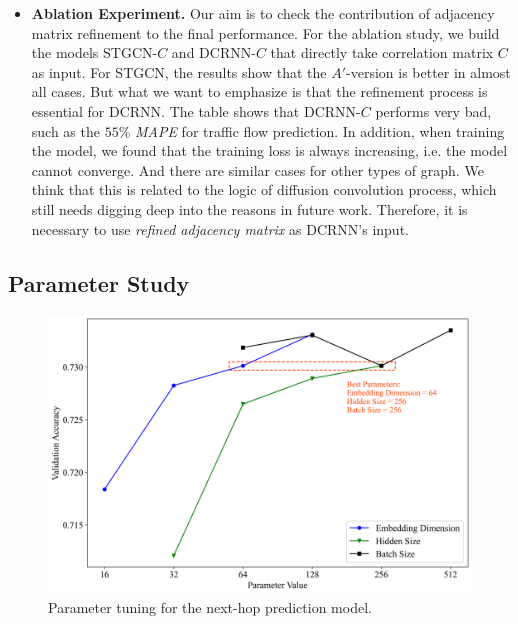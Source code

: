 \begin{itemize}
    \item \textbf{Ablation Experiment.} Our aim is to check the contribution of adjacency matrix refinement to the final performance. For the ablation study, we build the models STGCN-$C$ and DCRNN-$C$ that directly take correlation matrix $C$ as input. For STGCN, the results show that the $A'$-version is better in almost all cases. But what we want to emphasize is that the refinement process is essential for DCRNN. The table shows that DCRNN-$C$ performs very bad, such as the $55\%$ \textit{MAPE} for traffic flow prediction. In addition, when training the model, we found that the training loss is always increasing, i.e. the model cannot converge. And there are similar cases for other types of graph. We think that this is related to the logic of diffusion convolution process, which still needs digging deep into the reasons in future work. Therefore, it is necessary to use \textit{refined adjacency matrix} as DCRNN's input.
\end{itemize}

\subsection{Parameter Study}
\begin{figure}[htb]
    \centering
    \includegraphics[width=\textwidth]{images/next-hop_param.png}
    \caption{Parameter tuning for the next-hop prediction model.}
    \label{fig: next-hop_param}
\end{figure}

